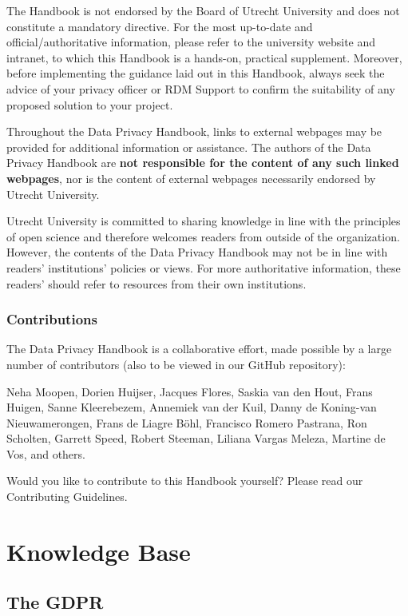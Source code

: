 \documentclass[
]{book}
\begin{document}
The Handbook is not endorsed by the Board of Utrecht University and does not constitute a mandatory directive.
For the most up-to-date and official/authoritative information, please refer to the
university website and
intranet, to which this Handbook is
a hands-on, practical supplement. Moreover, before implementing the guidance laid out in this Handbook, always seek
the advice of your privacy officer or RDM Support to confirm the suitability of any proposed solution to your project.

Throughout the Data Privacy Handbook, links to external webpages may be provided for additional information or assistance.
The authors of the Data Privacy Handbook are \textbf{not responsible for the content of any such linked webpages}, nor is the
content of external webpages necessarily endorsed by Utrecht University.

Utrecht University is committed to sharing knowledge in line with the principles of open science and therefore welcomes
readers from outside of the organization. However, the contents of the Data Privacy Handbook may not be in line with readers'
institutions' policies or views. For more authoritative information, these readers' should refer to resources from their own
institutions.

\hypertarget{contributions}{%
\section{Contributions}\label{contributions}}

The Data Privacy Handbook is a collaborative effort, made possible by a large number of contributors (also to be viewed
in our GitHub repository):

Neha Moopen, Dorien Huijser, Jacques Flores, Saskia van den Hout, Frans Huigen, Sanne Kleerebezem, Annemiek van der Kuil,
Danny de Koning-van Nieuwamerongen, Frans de Liagre Böhl, Francisco Romero Pastrana, Ron Scholten, Garrett Speed, Robert
Steeman, Liliana Vargas Meleza, Martine de Vos, and others.

Would you like to contribute to this Handbook yourself? Please read our
Contributing Guidelines.

\hypertarget{part-knowledge-base}{%
\part{Knowledge Base}\label{part-knowledge-base}}

\hypertarget{gdpr}{%
\chapter*{The GDPR}\label{gdpr}}
\end{document}
